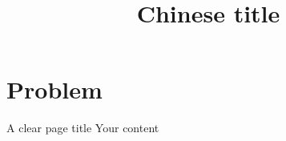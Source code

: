 \documentclass[aspectratio=169,
  fontset=none]{ctexbeamer}
\title[Short title]{Chinese title}
\begin{document}
\TitleSlide
\section{Problem}
\begin{frame}{A clear page title}
  Your content
\end{frame}
\end{document}
